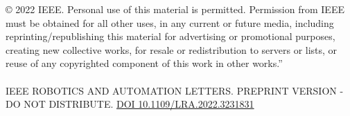 {
\onecolumn

© 2022 IEEE.  Personal use of this material is permitted.  Permission from IEEE must be obtained for all other uses, in any current or future media, including reprinting/republishing this material for advertising or promotional purposes, creating new collective works, for resale or redistribution to servers or lists, or reuse of any copyrighted component of this work in other works.”\\
\\
IEEE ROBOTICS AND AUTOMATION LETTERS. PREPRINT VERSION - DO NOT DISTRIBUTE. \href{https://doi.org/10.1109/LRA.2022.3231831}{DOI 10.1109/LRA.2022.3231831}
}
\newpage
\twocolumn
